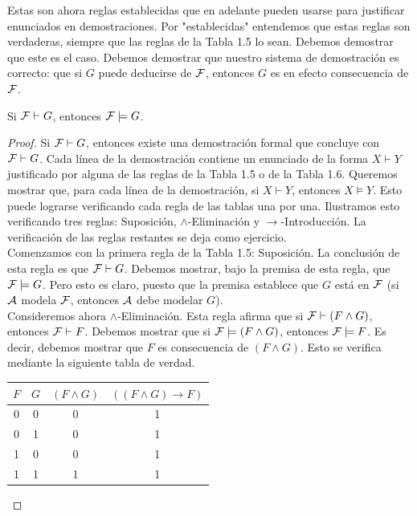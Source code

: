 \message{ !name(main.tex)}\documentclass[12pt,a4paper]{book}
\newcommand{\comillas}[1]{"#1"}
\begin{document}
    Estas son ahora reglas establecidas que en adelante pueden usarse para justificar enunciados en demostraciones. Por
    \comillas{establecidas} entendemos que estas reglas son verdaderas, siempre que las reglas de la Tabla 1.5 lo sean. Debemos
    demostrar que este es el caso. Debemos demostrar que nuestro sistema de demostración es correcto: que si $G$ puede deducirse
    de $\FF$, entonces $G$ es en efecto consecuencia de $\FF$.

    \begin{teorema}[Correctud]\label{thm:correccion}
        Si $\FF\vdash G$, entonces $\FF\models G$.
    \end{teorema}
    \begin{proof}
        Si $\FF\vdash G$, entonces existe una demostración formal que concluye con $\FF\vdash G$. Cada línea de la demostración
        contiene un enunciado de la forma $X\vdash Y$ justificado por alguna de las reglas de la Tabla 1.5 o de la Tabla 1.6.
        Queremos mostrar que, para cada línea de la demostración, si $X\vdash Y$, entonces $X\models Y$. Esto puede lograrse
        verificando cada regla de las tablas una por una. Ilustramos esto verificando tres reglas: Suposición, $\wedge$-Eliminación
        y $\rightarrow$-Introducción. La verificación de las reglas restantes se deja como ejercicio.\\
        Comenzamos con la primera regla de la Tabla 1.5: Suposición. La conclusión de esta regla es que $\FF\vdash G$. Debemos
        mostrar, bajo la premisa de esta regla, que $\FF\models G$. Pero esto es claro, puesto que la premisa establece que $G$
        está en $\FF$ (si $\AA$ modela $\FF$, entonces $\AA$ debe modelar $G$).\\
        Consideremos ahora $\wedge$-Eliminación. Esta regla afirma que si $\FF\vdash(F\wedge G)$, entonces $\FF\vdash F$. Debemos
        mostrar que si $\FF\models(F\wedge G)$, entonces $\FF\models F$. Es decir, debemos mostrar que $F$ es consecuencia de
        $(F\wedge G)$. Esto se verifica mediante la siguiente tabla de verdad.

        \begin{center}
        \renewcommand{\arraystretch}{1.5}
        \begin{tabular}{c | c | c | c}
            $F$ & $G$ & $(F\wedge G)$ & $((F\wedge G)\rightarrow F)$\\
            \hline
            0 & 0 & 0 & 1\\
            0 & 1 & 0 & 1\\
            1 & 0 & 0 & 1\\
            1 & 1 & 1 & 1\\
        \end{tabular}
        \end{center}


\end{proof}
\end{document}
